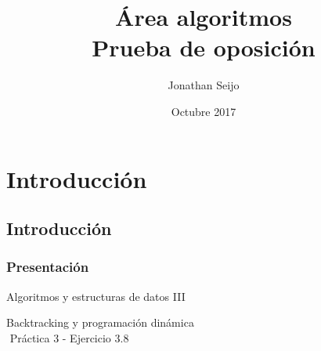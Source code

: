 \documentclass{beamer}
\title[Área algoritmos]{Área algoritmos \\ Prueba de oposición} %
\author{Jonathan Seijo} %
\institute[FCEN - UBA] %
{
\textit{jon.seijo@gmail.com} %
}
\date{Octubre 2017} %
\begin{document}
\begin{frame}
\titlepage %
\end{frame}



\section{Introducción} %


\subsection{Introducción} %

\begin{frame}
\frametitle{Presentación}

{\centering
    Algoritmos y estructuras de datos III \\
}
$ $\newline

{\centering
    Backtracking y programación dinámica \\
}
$ $\newline
{\centering
    Práctica 3 - Ejercicio 3.8 \\
}

\end{frame}
\end{document}
